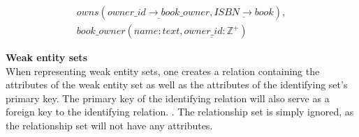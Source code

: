 \begin{equation}\label{eq:TotalOneToOne}
    \begin{split}
        owns(\underline{owner\_id \rightarrow book\_owner}, \underline{ISBN \rightarrow book}), \\
        book\_owner(name:text,\underline{owner\_id:\mathbb{Z}^+})
    \end{split}
\end{equation}


\textbf{Weak entity sets}\\
When representing weak entity sets, one creates a relation containing the attributes of the weak entity set as well as the attributes of the identifying set's primary key.
The primary key of the identifying relation will also serve as a foreign key to the identifying relation. \cite{DBSBook}.
The relationship set is simply ignored, as the relationship set will not have any attributes\cite{DBSBook}. 

